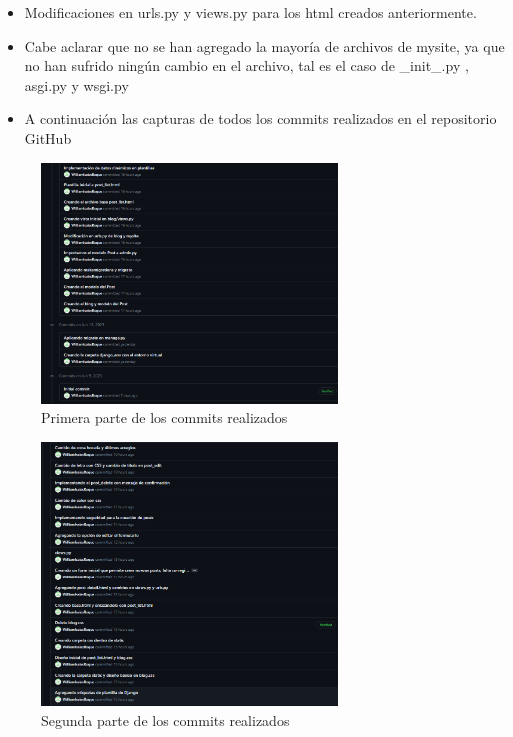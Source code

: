 \documentclass{article}
\begin{document}
        \begin{itemize}	
		\item Modificaciones en urls.py y views.py para los html creados anteriormente.
	\end{itemize}
        
        
        \begin{itemize}	
		\item Cabe aclarar que no se han agregado la mayoría de archivos de mysite, ya que no han sufrido ningún cambio en el archivo, tal es el caso de \_init\_.py , asgi.py y wsgi.py
        \end{itemize}
        \begin{itemize}	
		\item A continuación las capturas de todos los commits realizados en el repositorio GitHub
        \end{itemize}
        \begin{figure}[ht]
        \centering
        \includegraphics[width=0.7\textwidth]{img/commits1.png}
        \caption*{Primera parte de los commits realizados}
        \end{figure}
        \begin{figure}[ht]
        \centering
        \includegraphics[width=0.7\textwidth]{img/commits2.png}
        \caption*{Segunda parte de los commits realizados}
        \end{figure}
        
\end{document}
